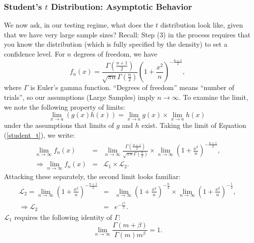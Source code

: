 \documentclass{article}
\numberwithin{equation}{section}
\begin{document}
\subsubsection{Student's $t$ Distribution: Asymptotic Behavior \label{sec_student_t_asymp}}
We now ask, in our testing regime, what does the $t$ distribution look like, given that we have very large sample sizes? Recall: Step (3) in the process requires that you know the distribution (which is fully specified by the density) to set a confidence level. For $n$ degrees of freedom, we have
\begin{equation} \label{student_t}
	f_n(x) = \frac{\Gamma\left(\frac{n+1}{2}\right)}{\sqrt{\pi n} \Gamma\left(\frac{n}{2}\right)}\left(1+\frac{x^2}{n}\right)^{-\frac{n+1}{2}},
\end{equation}
where $\Gamma$ is Euler's gamma function. ``Degrees of freedom'' means ``number of trials'', so our assumptions (Large Samples) imply $n\rightarrow\infty$. To examine the limit, we note the following property of limits: 
\begin{equation}
	\lim_{x\rightarrow a} \left(g(x) h(x)\right) = \lim_{x\rightarrow a}  g(x) \times  \lim_{x\rightarrow a} h(x)\,
\end{equation}
under the assumptions that limits of $g$ and $h$ exist. Taking the limit of Equation (\ref{student_t}), we write:
\begin{eqnarray} \label{student_t_large_n} \nonumber
	\lim_{n\rightarrow \infty}f_n(x) &=& \lim_{n\rightarrow \infty} \frac{\Gamma\left(\frac{n+1}{2}\right)}{\sqrt{\pi n} \Gamma\left(\frac{n}{2}\right)} \times \lim_{n\rightarrow \infty} \left(1+\frac{x^2}{n}\right)^{-\frac{n+1}{2}}, \\
   	\Rightarrow \lim_{n\rightarrow \infty}f_n(x) &=& \mathcal{L}_1 \times \mathcal{L}_2.
\end{eqnarray}
Attacking these separately, the second limit looks familiar:
\begin{eqnarray} \label{second_part}
	\nonumber \mathcal{L}_2 = \lim_{n\rightarrow \infty} \left(1+\frac{x^2}{n}\right)^{-\frac{n+1}{2}}  &=& \lim_{n\rightarrow \infty} \left(1+\frac{x^2}{n}\right)^{-\frac{n}{2}} \times \lim_{n\rightarrow \infty} \left(1+\frac{x^2}{n}\right)^{-\frac{1}{2}}, \\
	\Rightarrow \mathcal{L}_2 &=& e^{-\frac{x^2}{2}}.
\end{eqnarray}
$\mathcal{L}_1$ requires the following identity of $\Gamma$:
\begin{equation} \label{useful_identity}
	\lim_{n\rightarrow \infty} \frac{\Gamma(m+\beta)}{\Gamma(m) m^\beta} = 1.
\end{equation}
\end{document}
